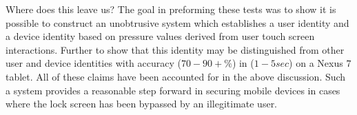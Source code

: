 Where does this leave us?
The goal in preforming these tests was to show it is possible to construct
an 
%
unobtrusive system which 
establishes a user identity 
and a device identity
based on pressure values 
derived from user touch screen interactions.
%
Further to show that this identity may be 
distinguished from other 
user and device identities with accuracy ($70-90+\%$)
in ($1-5 sec$) on a Nexus $7$ tablet.
%
All of these claims have been accounted for
in the above discussion.
%
Such a system provides a reasonable step forward in
securing mobile devices in cases where the lock screen has
been bypassed by an illegitimate user.
